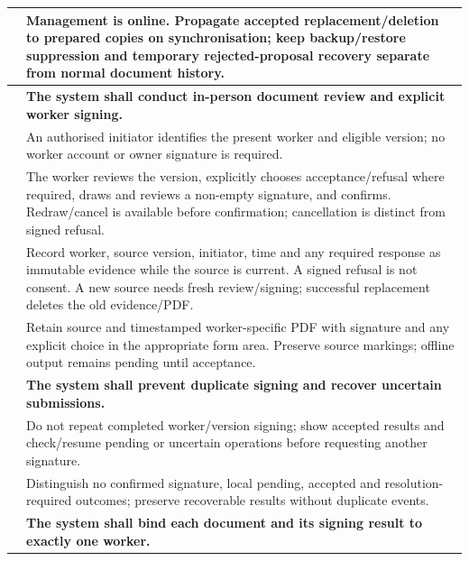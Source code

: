 {\begin{longtable}{L{0.18}L{0.82}}
\label{ac:041:d} & Management is online. Propagate accepted replacement/deletion to prepared copies on synchronisation; keep backup/restore suppression and temporary rejected-proposal recovery separate from normal document history.\\
\midrule
{}
\label{fr:042}\textbf{} & \textbf{The system shall conduct in-person document review and explicit worker signing.}\\*
\label{ac:042:a} & An authorised initiator identifies the present worker and eligible version; no worker account or owner signature is required.\\
\label{ac:042:b} & The worker reviews the version, explicitly chooses acceptance/refusal where required, draws and reviews a non-empty signature, and confirms. Redraw/cancel is available before confirmation; cancellation is distinct from signed refusal.\\
\label{ac:042:c} & Record worker, source version, initiator, time and any required response as immutable evidence while the source is current. A signed refusal is not consent. A new source needs fresh review/signing; successful replacement deletes the old evidence/PDF.\\
\label{ac:042:d} & Retain source and timestamped worker-specific PDF with signature and any explicit choice in the appropriate form area. Preserve source markings; offline output remains pending until acceptance.\\
\midrule
{}
\label{fr:043}\textbf{} & \textbf{The system shall prevent duplicate signing and recover uncertain submissions.}\\*
\label{ac:043:a} & Do not repeat completed worker/version signing; show accepted results and check/resume pending or uncertain operations before requesting another signature.\\
\label{ac:043:b} & Distinguish no confirmed signature, local pending, accepted and resolution-required outcomes; preserve recoverable results without duplicate events.\\
\midrule
{}
\label{fr:044}\textbf{} & \textbf{The system shall bind each document and its signing result to exactly one worker.}\\*

\end{longtable}}
